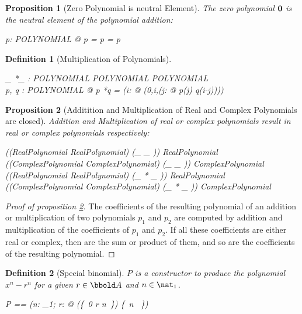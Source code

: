 \documentclass[12pt]{scrartcl}
\newtheorem{prop}{Proposition}[section]
\newtheorem{zdef}{Definition}[section]
\begin{document}
\begin{prop}[Zero Polynomial is neutral Element]
  \label{prop:zero-polynomial-neutral-element}
  The zero polynomial $\mathbf{0}$ is the neutral element of the
  polynomial addition:
  \begin{zed}
    \forall p: POLYNOMIAL @ p \polyplus \zeropol = \zeropol \polyplus
    p = p
  \end{zed}
\end{prop}
% 
\newcommand{\polymult}{*}
\begin{zdef}[Multiplication of Polynomials]
  \label{zdef:polynomial-multiplication}
  \begin{axdef}
    \_ \polymult \_ : POLYNOMIAL \cross POLYNOMIAL \fun POLYNOMIAL\\
    \where
    \forall p, q : POLYNOMIAL @ p \polymult q = (\lambda i: \nat @
    \finsum(0,i,(\lambda j: \nat @ p(j) \amult q(i-j))))
  \end{axdef}
\end{zdef}
%
%
\begin{prop}[Additition and Multiplication of Real and Complex
  Polynomials are closed]
  \label{prop:closure-of-real-complex-addition-multiplication}
  Addition and Multiplication of real or complex polynomials result in
  real or complex polynomials respectively:
  \begin{zed}
    \ran ((RealPolynomial \cross RealPolynomial) \dres (\_ \polyplus
    \_ )) \subseteq RealPolynomial\\
    \ran ((ComplexPolynomial \cross ComplexPolynomial) \dres (\_ \polyplus
    \_ )) \subseteq ComplexPolynomial\\
    \ran ((RealPolynomial \cross RealPolynomial) \dres (\_ \polymult
    \_ )) \subseteq RealPolynomial\\
    \ran ((ComplexPolynomial \cross ComplexPolynomial) \dres (\_ \polymult
    \_ )) \subseteq ComplexPolynomial\\
  \end{zed}
\end{prop}
\begin{proof}[Proof of proposition
  \ref{prop:closure-of-real-complex-addition-multiplication}]
  The coefficients of the resulting polynomial of an addition or
  multiplication of two polynomials $p_1$ and $p_2$ are computed by addition and
  multiplication of the coefficients of $p_1$ and $p_2$. If all these
  coefficients are either real or complex, then are the sum or product
  of them, and so are the coefficients of the resulting polynomial.
\end{proof}
%
\begin{zdef}[Special binomial]
  \label{zdef:special-binnomial}
  $P$ is a constructor to produce the polynomial $x^n - r^n$ for a
  given $r \in \arithmos$ and $n \in \nat_1$.
  \begin{zed}
    P == (\lambda n: \nat_1; r: \arithmos @ (\zeropol \oplus \{~0 \mapsto
    r \apwr n~\}) \oplus \{~n \mapsto \aone ~\})
  \end{zed}
\end{zdef}
\end{document}
